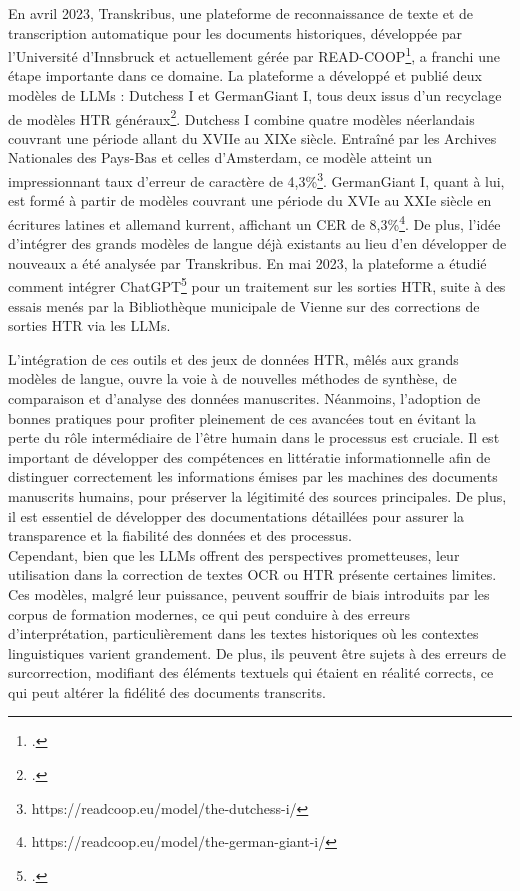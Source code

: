 \documentclass[a4paper,12pt,twoside]{book}
\begin{document}
	En avril 2023, Transkribus, une plateforme de reconnaissance de texte et de transcription automatique pour les documents historiques, développée par l'Université d'Innsbruck et actuellement gérée par READ-COOP\footcite{kahle_transkribus_2017}, a franchi une étape importante dans ce domaine. La plateforme a développé et publié deux modèles de LLMs : Dutchess I et GermanGiant I, tous deux issus d'un recyclage de modèles HTR généraux\footcite{nockels_implications_2024}. Dutchess I combine quatre modèles néerlandais couvrant une période allant du XVIIe au XIXe siècle. Entraîné par les Archives Nationales des Pays-Bas et celles d'Amsterdam, ce modèle atteint un impressionnant taux d'erreur de caractère de 4,3\%\footnote{ https://readcoop.eu/model/the-dutchess-i/ }. GermanGiant I, quant à lui, est formé à partir de modèles couvrant une période du XVIe au XXIe siècle en écritures latines et allemand kurrent, affichant un CER de 8,3\%\footnote{ https://readcoop.eu/model/the-german-giant-i/}. De plus, l’idée d’intégrer des grands modèles de langue déjà existants au lieu d'en développer de nouveaux a été analysée par Transkribus. En mai 2023, la plateforme a étudié comment intégrer ChatGPT\footcite{nockels_implications_2024} pour un traitement sur les sorties HTR, suite à des essais menés par la Bibliothèque municipale de Vienne sur des corrections de sorties HTR via les LLMs.
	
	L’intégration de ces outils et des jeux de données HTR, mêlés aux grands modèles de langue, ouvre la voie à de nouvelles méthodes de synthèse, de comparaison et d’analyse des données manuscrites. Néanmoins, l’adoption de bonnes pratiques pour profiter pleinement de ces avancées tout en évitant la perte du rôle intermédiaire de l’être humain dans le processus est cruciale. Il est important de développer des compétences en littératie informationnelle afin de distinguer correctement les informations émises par les machines des documents manuscrits humains, pour préserver la légitimité des sources principales. De plus, il est essentiel de développer des documentations détaillées pour assurer la transparence et la fiabilité des données et des processus.
	\\
	
	Cependant, bien que les LLMs offrent des perspectives prometteuses, leur utilisation dans la correction de textes OCR ou HTR présente certaines limites. Ces modèles, malgré leur puissance, peuvent souffrir de biais introduits par les corpus de formation modernes, ce qui peut conduire à des erreurs d’interprétation, particulièrement dans les textes historiques où les contextes linguistiques varient grandement. De plus, ils peuvent être sujets à des erreurs de surcorrection, modifiant des éléments textuels qui étaient en réalité corrects, ce qui peut altérer la fidélité des documents transcrits.
	
\end{document}

